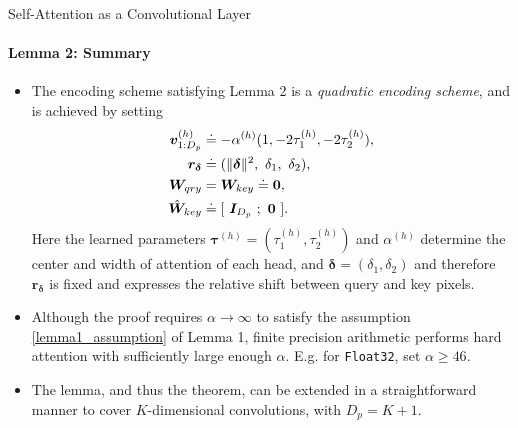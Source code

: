 \documentclass[9pt]{beamer}
\newcommand{\mb}{\bm}
\begin{document}
\begin{frame}{Self-Attention as a Convolutional Layer}
\framesubtitle{Lemma 2: Summary}
\begin{itemize}
\item The encoding scheme satisfying Lemma 2 is a {\em quadratic encoding scheme}, and is achieved by setting
\begin{align}
    \mb v_{1:D_p}\brac h &\doteq -\alpha\brac h 
        (1, -2\tau_1\brac h, -2\tau_2\brac h), \nonumber \\
    \mb r_{\bm \delta} &\doteq (\Vert\bm\delta\Vert^2,\ \delta_1,\ \delta_2), 
    \label{quad_encoding} \\
    \mb W_{qry} &= \mb W_{key} \doteq \bm 0, \nonumber \\
    \hat{\mb W}_{key} &\doteq [\ \bm I_{D_p}\ ; \ \bm 0\ ]. \nonumber
\end{align}
Here the learned parameters $\bm\tau^{(h)} = (\tau_1^{(h)}, \tau_2^{(h)})$ and $\alpha^{(h)}$ determine the center and width of attention of each head, and $\bm\delta = (\delta_1, \delta_2)$ and therefore $\bm r_{\bm \delta}$ is fixed and expresses the relative shift between query and key pixels.

\item Although the proof requires $\alpha\rightarrow\infty$ to satisfy the assumption \eqref{lemma1_assumption} of Lemma 1, finite precision arithmetic performs hard attention with sufficiently large enough $\alpha$. E.g. for \texttt{Float32}, set $\alpha\geq46$. 

\item The lemma, and thus the theorem, can be extended in a straightforward manner to cover $K$-dimensional convolutions, with $D_p=K+1$.
\end{itemize}
\end{frame}
\end{document}
